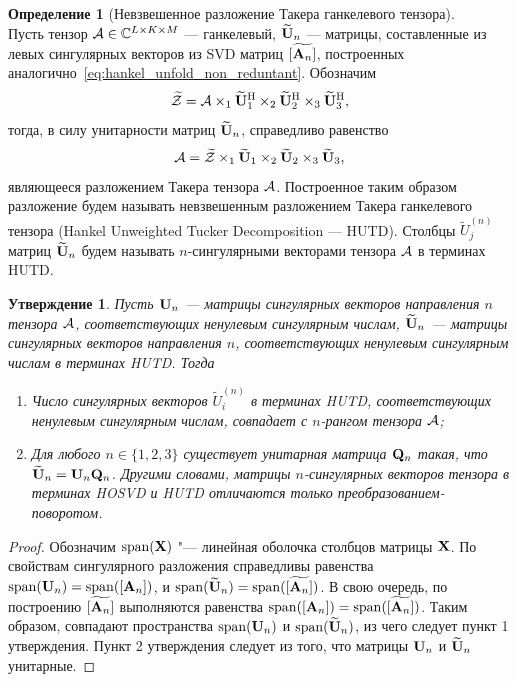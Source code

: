 \documentclass[specialist,
  substylefile = spbu.rtx,
subf,href,colorlinks=true, 12pt]{disser}
\theoremstyle{plain}
\newtheorem{statement}{Утверждение}[section]
\theoremstyle{definition}
\newtheorem{definition}{Определение}[section]
\theoremstyle{remark}
\def\newdecomp/{HUTD}
\def\newdecompfull/{Hankel Un\-weight\-ed Tucker Decomposition}
\def\newdecompru/{Невзвешенное разложение Такера ганкелевого тензора}
\def\newdecomprugenitive/{невзвешенным разложением Такера ганкелевого тензора}
\begin{document}
\begin{definition}[\newdecompru/]\label{def:newdecomp}~\\
  Пусть тензор $\mathcal{A}\in \mathbb{C}^{L\times K\times M}$ --- ганкелевый,
  $\widetilde{\mathbf{U}}_n$ --- матрицы, составленные из левых
  сингулярных векторов из SVD матриц $\widetilde{[\mathbf{A}_n]}$,
  построенных аналогично~\eqref{eq:hankel_unfold_non_reduntant}.
  Обозначим
  \[
    \widetilde{\mathcal{Z}} = \mathcal{A} \times_1 \widetilde{\mathbf{U}}_1^{\mathrm{H}}
    \times_2 \widetilde{\mathbf{U}}_2^{\mathrm{H}}
    \times_3 \widetilde{\mathbf{U}}_3^{\mathrm{H}},
  \]
  тогда, в силу унитарности матриц $\widetilde{\mathbf{U}}_n$, справедливо равенство
  \[
    \mathcal{A} = \widetilde{\mathcal{Z}} \times_1
    \widetilde{\mathbf{U}}_1 \times_2 \widetilde{\mathbf{U}}_2 \times_3
    \widetilde{\mathbf{U}}_3,
  \]
  являющееся разложением Такера тензора $\mathcal{A}$.
  Построенное таким образом разложение будем называть \newdecomprugenitive/
  (\newdecompfull/ --- \newdecomp/). Столбцы $\widetilde{U}_j^{(n)}$ матриц
  $\widetilde{\mathbf{U}}_n$ будем называть $n$-сингулярными векторами
  тензора $\mathcal{A}$ в терминах \newdecomp/.
\end{definition}

\begin{statement}\label{state:newdecomp-ranks-rotation}
  Пусть $\mathbf{U}_n$ --- матрицы сингулярных векторов направления $n$
  тензора $\mathcal{A}$, соответствующих ненулевым сингулярным числам,
  $\widetilde{\mathbf{U}}_n$ --- матрицы сингулярных
  векторов направления $n$, соответствующих ненулевым сингулярным
  числам в терминах \newdecomp/. Тогда
  \begin{enumerate}
    \item Число сингулярных векторов $\widetilde{U}_i^{(n)}$ в
      терминах \newdecomp/,
      соответствующих ненулевым сингулярным числам, совпадает с
      $n$-рангом тензора $\mathcal{A}$;
    \item Для любого $n\in \{1, 2, 3\}$ существует унитарная
      матрица $\mathbf{Q}_n$ такая, что $\widetilde{\mathbf{U}}_n = \mathbf{U}_n\mathbf{Q}_n$.
      Другими словами, матрицы $n$-сингулярных векторов тензора в
      терминах HOSVD и \newdecomp/ отличаются только
      преобразованием-поворотом.
  \end{enumerate}
\end{statement}
\begin{proof}
  Обозначим $\operatorname{span}(\mathbf{X})$ "--- линейная оболочка
  столбцов матрицы
  $\mathbf{X}$. По свойствам сингулярного разложения справедливы равенства
  $\operatorname{span}(\mathbf{U}_n) =\operatorname{span} ([\mathbf{A}_n])$,
  и $\operatorname{span}(\widetilde{\mathbf{U}}_n) =
  \operatorname{span}(\widetilde{[\mathbf{A}_n]})$. В свою очередь, по построению
  $\widetilde{[\mathbf{A}_n]}$ выполняются равенства
  $\operatorname{span}([\mathbf{A}_n]) = \operatorname{span}(\widetilde{[\mathbf{A}_n]})$.
  Таким образом, совпадают пространства
  $\operatorname{span}(\mathbf{U}_n)$ и
  $\operatorname{span}(\widetilde{\mathbf{U}}_n)$, из чего следует пункт 1
  утверждения.
  Пункт 2 утверждения следует из того, что матрицы $\mathbf{U}_n$ и
  $\widetilde{\mathbf{U}}_n$ унитарные.
\end{proof}
\end{document}
